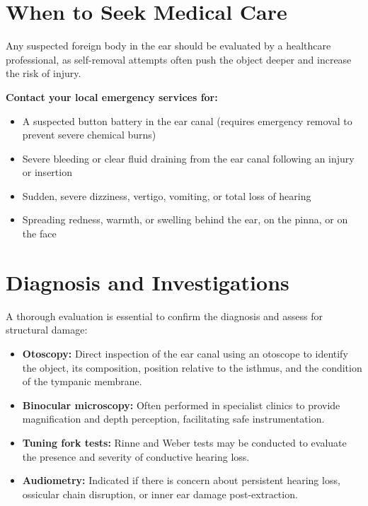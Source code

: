 \section*{When to Seek Medical Care}
Any suspected foreign body in the ear should be evaluated by a healthcare professional, as self-removal attempts often push the object deeper and increase the risk of injury.

\textbf{Contact your local emergency services for:}
\begin{itemize}
    \item A suspected button battery in the ear canal (requires emergency removal to prevent severe chemical burns)
    \item Severe bleeding or clear fluid draining from the ear canal following an injury or insertion
    \item Sudden, severe dizziness, vertigo, vomiting, or total loss of hearing
    \item Spreading redness, warmth, or swelling behind the ear, on the pinna, or on the face
\end{itemize}

\section*{Diagnosis and Investigations}
A thorough evaluation is essential to confirm the diagnosis and assess for structural damage:
\begin{itemize}
    \item \textbf{Otoscopy:} Direct inspection of the ear canal using an otoscope to identify the object, its composition, position relative to the isthmus, and the condition of the tympanic membrane.
    \item \textbf{Binocular microscopy:} Often performed in specialist clinics to provide magnification and depth perception, facilitating safe instrumentation.
    \item \textbf{Tuning fork tests:} Rinne and Weber tests may be conducted to evaluate the presence and severity of conductive hearing loss.
    \item \textbf{Audiometry:} Indicated if there is concern about persistent hearing loss, ossicular chain disruption, or inner ear damage post-extraction.
\end{itemize}

